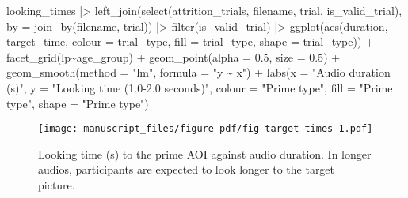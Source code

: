 \documentclass[
  letterpaper,
  DIV=11,
  numbers=noendperiod]{scrartcl}
\newenvironment{Shaded}{\begin{snugshade}}{\end{snugshade}}
\newcommand{\AttributeTok}[1]{\textcolor[rgb]{0.40,0.45,0.13}{#1}}
\newcommand{\FloatTok}[1]{\textcolor[rgb]{0.68,0.00,0.00}{#1}}
\newcommand{\FunctionTok}[1]{\textcolor[rgb]{0.28,0.35,0.67}{#1}}
\newcommand{\NormalTok}[1]{\textcolor[rgb]{0.00,0.23,0.31}{#1}}
\newcommand{\SpecialCharTok}[1]{\textcolor[rgb]{0.37,0.37,0.37}{#1}}
\newcommand{\StringTok}[1]{\textcolor[rgb]{0.13,0.47,0.30}{#1}}
\begin{document}
\begin{Shaded}
\begin{Highlighting}[]
\NormalTok{looking\_times }\SpecialCharTok{|\textgreater{}}
    \FunctionTok{left\_join}\NormalTok{(}\FunctionTok{select}\NormalTok{(attrition\_trials, }
\NormalTok{                     filename, trial, is\_valid\_trial),}
              \AttributeTok{by =} \FunctionTok{join\_by}\NormalTok{(filename, trial)) }\SpecialCharTok{|\textgreater{}}
    \FunctionTok{filter}\NormalTok{(is\_valid\_trial) }\SpecialCharTok{|\textgreater{}} 
    \FunctionTok{ggplot}\NormalTok{(}\FunctionTok{aes}\NormalTok{(duration,}
\NormalTok{               target\_time,}
               \AttributeTok{colour =}\NormalTok{ trial\_type, }
               \AttributeTok{fill =}\NormalTok{ trial\_type,}
               \AttributeTok{shape =}\NormalTok{ trial\_type)) }\SpecialCharTok{+}
    \FunctionTok{facet\_grid}\NormalTok{(lp}\SpecialCharTok{\textasciitilde{}}\NormalTok{age\_group) }\SpecialCharTok{+}
    \FunctionTok{geom\_point}\NormalTok{(}\AttributeTok{alpha =} \FloatTok{0.5}\NormalTok{,}
               \AttributeTok{size =} \FloatTok{0.5}\NormalTok{) }\SpecialCharTok{+}
    \FunctionTok{geom\_smooth}\NormalTok{(}\AttributeTok{method =} \StringTok{"lm"}\NormalTok{,}
                \AttributeTok{formula =} \StringTok{"y \textasciitilde{} x"}\NormalTok{) }\SpecialCharTok{+}
    \FunctionTok{labs}\NormalTok{(}\AttributeTok{x =} \StringTok{"Audio duration (s)"}\NormalTok{,}
         \AttributeTok{y =} \StringTok{"Looking time (1.0{-}2.0 seconds)"}\NormalTok{,}
         \AttributeTok{colour =} \StringTok{"Prime type"}\NormalTok{,}
         \AttributeTok{fill =} \StringTok{"Prime type"}\NormalTok{,}
         \AttributeTok{shape =} \StringTok{"Prime type"}\NormalTok{)}
\end{Highlighting}
\end{Shaded}

\begin{figure}[H]

{\centering \texttt{[image: manuscript\_files/figure-pdf/fig-target-times-1.pdf]}

}

\caption{\label{fig-target-times}Looking time (s) to the prime AOI
against audio duration. In longer audios, participants are expected to
look longer to the target picture.}

\end{figure}
\end{document}
